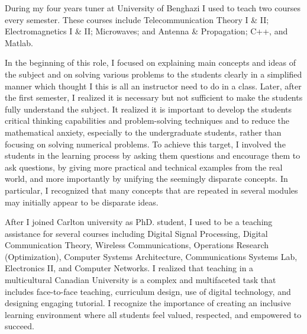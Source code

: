 \documentclass[11pt]{article}
\begin{document}
During my four years tuner at University of Benghazi I used to teach two courses every semester. These courses include Telecommunication Theory I \& II; Electromagnetics I \& II; Microwaves; and Antenna \& Propagation; C++, and Matlab. 



In the beginning of this role, I focused on explaining main concepts and ideas of the subject and on solving various problems to the students clearly  in a simplified manner which thought I this is all an instructor need to do in a class.  Later, after the first semester, I realized it is necessary but not sufficient to make the students fully understand the subject. It realized it is important to develop the students critical thinking capabilities and problem-solving techniques and to reduce the mathematical anxiety, especially to the undergraduate students, rather than focusing on solving numerical problems. To achieve this target, I involved the students in the learning process by asking them questions and encourage them to ask questions, by giving more practical and technical examples from the real world, and more importantly by unifying the seemingly disparate concepts. In particular, I recognized that many concepts that are repeated in several modules may initially appear to be disparate ideas. 





After I joined Carlton university as PhD. student, I used to be a teaching assistance for several courses including Digital Signal Processing, Digital Communication Theory, Wireless Communications, Operations Research (Optimization),  Computer Systems Architecture, Communications Systems Lab, Electronics II, and Computer Networks. I realized that teaching in a multicultural Canadian University is a complex and multifaceted task that includes face-to-face teaching, curriculum design, use of digital technology, and designing engaging tutorial. 
I recognize the importance of creating an inclusive learning environment where all students feel valued, respected, and empowered to succeed. 
\end{document}
